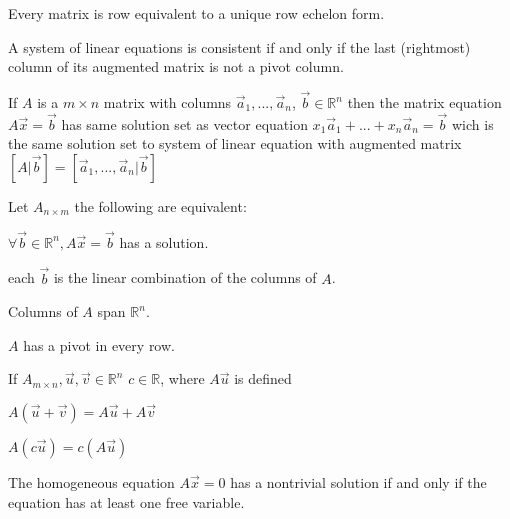 \documentclass[5pt]{article}
\begin{document}
\begin{multicols}{2}
\begin{theorem}
  Every matrix is row equivalent to a unique row echelon form.
\end{theorem}

\begin{theorem}
  A system of linear equations is consistent if and only if the last (rightmost) column of its augmented
matrix is not a pivot column.
\end{theorem}

\begin{theorem}
  If $A$ is a $m\times n$ matrix  with columns $\vec{a}_1, ..., \vec{a}_n$, $\vec{b}\in\mathbb{R}^n$ 
  then the matrix equation $A\vec{x}=\vec{b}$ has same solution set as vector equation $x_1\vec{a}_1 + ... + x_n\vec{a}_n=\vec{b}$  
  wich is the same solution set to system of linear equation with augmented matrix 
  $\left[A|\vec{b}\right]=\left[\vec{a}_1, ..., \vec{a}_n|\vec{b}\right]$ 
\end{theorem}

\begin{theorem}
  Let $A_{n\times m}$ the following are equivalent:
  \begin{itemize*}
    \item $\forall\vec{b}\in\mathbb{R}^n, A\vec{x}=\vec{b}$ has a solution.
    \item each $\vec{b}$ is the linear combination of the columns of $A$.
    \item Columns of $A$ span $\mathbb{R}^n$.
    \item $A$ has a pivot in every row.
  \end{itemize*}
\end{theorem}

\begin{theorem}
  If $A_{m\times n},\vec{u},\vec{v}\in\mathbb{R}^n$ $c\in\mathbb{R}$, where $A\vec{u}$ is defined\\
  \begin{itemize*}
    \item $A(\vec{u}+\vec{v})=A\vec{u}+A\vec{v}$
    \item $A(c\vec{u})=c(A\vec{u})$
  \end{itemize*}
\end{theorem}

\begin{theorem}
  The homogeneous equation $A\vec{x}=0$ has a nontrivial solution if and only if the equation has at least
  one free variable.
\end{theorem}


\end{multicols}
\end{document}

